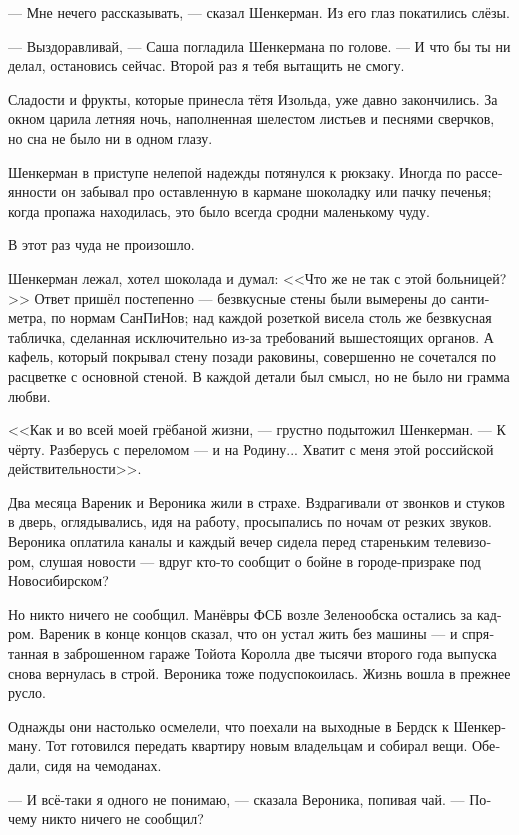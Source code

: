 \documentclass[a5paper,12pt,fleqn]{extbook}\usepackage{cooltooltips}\usepackage{polyglossia}\setdefaultlanguage[babelshorthands=true]{russian}\setotherlanguage{english}\defaultfontfeatures{Ligatures=TeX,Mapping=tex-text} \usepackage{xcolor}\definecolor{lightgray}{HTML}{bbbbbb}\color{lightgray}\newcommand{\ml}[3]{\textenglish{\textcolor{black}{#3}}}
\newcommand{\asterism}{\vspace{1em}{\centering\Large\bfseries$\ast~\ast~\ast$\par}\vspace{1em}}
\begin{document}
--- Мне нечего рассказывать, --- сказал Шенкерман.
Из его глаз покатились слёзы.

--- Выздоравливай, --- Саша погладила Шенкермана по голове.
--- И что бы ты ни делал, остановись сейчас.
Второй раз я тебя вытащить не смогу.

Сладости и фрукты, которые принесла тётя Изольда, уже давно закончились.
За окном царила летняя ночь, наполненная шелестом листьев и песнями сверчков, но сна не было ни в одном глазу.

Шенкерман в приступе нелепой надежды потянулся к рюкзаку.
Иногда по рассеянности он забывал про оставленную в кармане шоколадку или пачку печенья;
когда пропажа находилась, это было всегда сродни маленькому чуду.

В этот раз чуда не произошло.

Шенкерман лежал, хотел шоколада и думал: <<Что же не так с этой больницей?>>
Ответ пришёл постепенно --- безвкусные стены были вымерены до сантиметра, по нормам СанПиНов;
над каждой розеткой висела столь же безвкусная табличка, сделанная исключительно из-за требований вышестоящих органов.
А кафель, который покрывал стену позади раковины, совершенно не сочетался по расцветке с основной стеной.
В каждой детали был смысл, но не было ни грамма любви.

<<Как и во всей моей грёбаной жизни, --- грустно подытожил Шенкерман.
--- К чёрту.
Разберусь с переломом --- и на Родину...
Хватит с меня этой российской действительности>>.

\asterism

Два месяца Вареник и Вероника жили в страхе.
Вздрагивали от звонков и стуков в дверь, оглядывались, идя на работу, просыпались по ночам от резких звуков.
Вероника оплатила каналы и каждый вечер сидела перед стареньким телевизором, слушая новости --- вдруг кто-то сообщит о бойне в городе-призраке под Новосибирском?

Но никто ничего не сообщил.
Манёвры ФСБ возле Зеленообска остались за кадром.
Вареник в конце концов сказал, что он устал жить без машины --- и спрятанная в заброшенном гараже Тойота Королла две тысячи второго года выпуска снова вернулась в строй.
Вероника тоже подуспокоилась.
Жизнь вошла в прежнее русло.

Однажды они настолько осмелели, что поехали на выходные в Бердск к Шенкерману.
Тот готовился передать квартиру новым владельцам и собирал вещи.
Обедали, сидя на чемоданах.

--- И всё-таки я одного не понимаю, --- сказала Вероника, попивая чай.
--- Почему никто ничего не сообщил?
\end{document}
